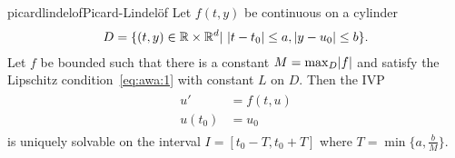 \begin{Theorem*}{picardlindelof}{Picard-Lindelöf}
  Let $f(t,y)$ be continuous on a cylinder
  \begin{gather*}
    D = \{ (t,y) \in \mathbb R \times
    \mathbb R^d | \ |t-t_0| \le a, |y-u_0| \le b \}.
  \end{gather*}
  Let $f$ be bounded such that there is a constant $M = \max_D
  \lvert f\rvert$ and satisfy the Lipschitz condition~\eqref{eq:awa:1} with
  constant $L$ on $D$.  Then the IVP
  \begin{gather*}
    \begin{split}
      u' &= f(t,u) \\ u(t_0) &= u_0
    \end{split}
  \end{gather*}
  is uniquely solvable on the interval
  $I = [t_0-T,t_0+T]$ where
  $T = \min \{ a, \frac{b}{M} \}$.
\end{Theorem*}

